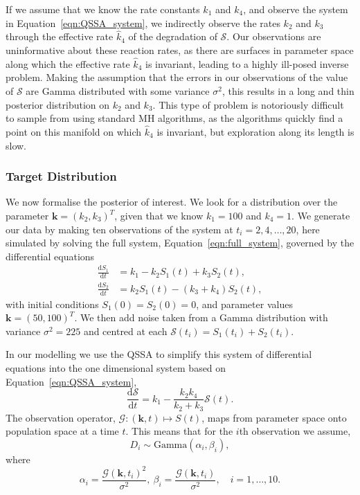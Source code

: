 \documentclass[final]{siamltex}
\begin{document}
If we assume that we know the rate constants $k_1$ and $k_4$, and
observe the system in Equation~\ref{eqn:QSSA_system}, we indirectly
observe the rates $k_2$ and $k_3$ through the effective rate
$\hat{k}_4$ of the degradation of $\mathcal{S}$. Our
observations are uninformative about these reaction rates, as there
are surfaces in parameter space along which the effective rate
$\hat{k}_4$ is invariant, leading to a highly ill-posed inverse
problem. Making the assumption that the errors in our observations of
the value of $\mathcal{S}$ are Gamma distributed with some variance
$\sigma^2$, this results in a long and thin posterior distribution on
$k_2$ and $k_3$. This type of problem is notoriously difficult to
sample from using standard MH algorithms, as the algorithms quickly
find a point on this manifold on which $\hat{k}_4$ is invariant, but
exploration along its length is slow.

\subsubsection{Target Distribution}

We now formalise the posterior of interest. We look for a distribution over the parameter $\mathbf{k} = (k_2, k_3)^T$, given that we know $k_1 = 100$ and $k_4=1$. We generate our data by making ten observations of the system at $t_i = 2, 4, \dots, 20$, here simulated by solving the full system, Equation~\ref{eqn:full_system}, governed by the differential equations
\begin{align*}
	\frac{\text{d}S_1}{\text{d}t} &= k_1 - k_2S_1(t)+k_3S_2(t), \\
	\frac{\text{d}S_2}{\text{d}t} &= k_2S_1(t) - (k_3+k_4)S_2(t),
\end{align*}
with initial conditions $S_1(0)=S_2(0) = 0$, and parameter values $\mathbf{k} = (50, 100)^T$. We then add noise taken from a Gamma distribution with variance $\sigma^2 = 225$ and centred at each $\mathcal{S}(t_i)=S_1(t_i)+S_2(t_i)$.

In our modelling we use the QSSA to simplify this system of differential equations into the one dimensional system based on Equation~\ref{eqn:QSSA_system},
\[
	\frac{\text{d}\mathcal{S}}{\text{d}t} = k_1 - \frac{k_2k_4}{k_2+k_3}\mathcal{S}(t).
\]
The observation operator, $\mathcal{G}: (\mathbf{k},t) \mapsto S(t)$, maps from parameter space onto population space at a time $t$. This means that for the $i$th observation we assume,
\[
	 D_i \sim \text{Gamma}(\alpha_i, \beta_i),
\]
where
\[
	 \alpha_i = \frac{\mathcal{G}(\mathbf{k}, t_i)^2}{\sigma^2},\  \beta_i = \frac{\mathcal{G}(\mathbf{k}, t_i)}{\sigma^2}, \quad i = 1, \dots, 10.
\]
\end{document}
